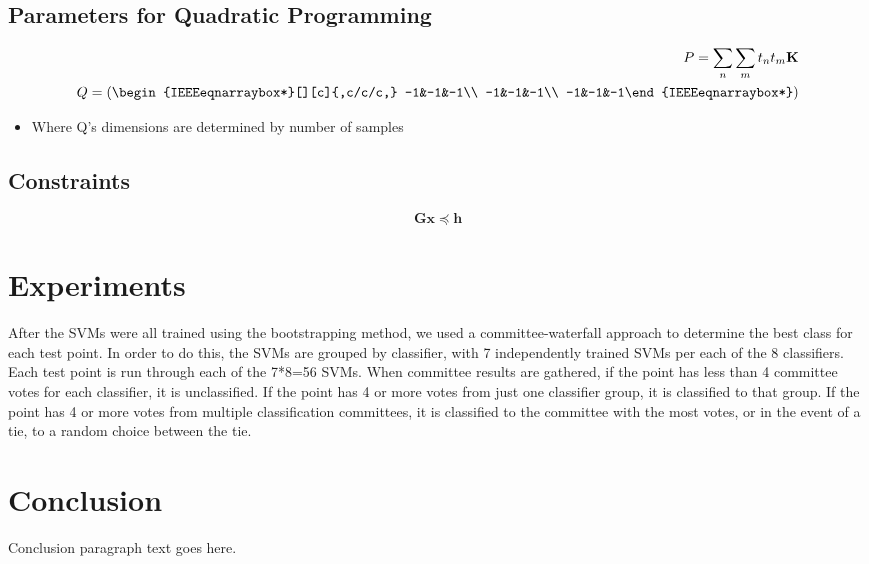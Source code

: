 \documentclass[journal]{IEEEtran}
\begin{document}
    \subsection{Parameters for Quadratic Programming}
    \begin{eqnarray}
    P = \sum\limits_{n} \sum\limits_{m} t_n t_m \mathbf{K}\\
    Q = \left(\begin{IEEEeqnarraybox*}[][c]{,c/c/c,}
    -1&-1&-1\\
    -1&-1&-1\\
    -1&-1&-1%
    \end{IEEEeqnarraybox*}\right)
    \end{eqnarray}
    \begin{itemize}
    \item Where Q's dimensions are determined by number of samples
    \end{itemize}

    \subsection{Constraints}
    \begin{equation}
    \mathbf{G} \mathbf{x} \preceq \mathbf{h}
    \end{equation}



\section{Experiments}

After the SVMs were all trained using the bootstrapping method, we used a committee-waterfall approach to determine the best class for each test point.  In order to do this, the SVMs are grouped by classifier, with 7 independently trained SVMs per each of the 8 classifiers.  Each test point is run through each of the 7*8=56 SVMs.  When committee results are gathered, if the point has less than 4 committee votes for each classifier, it is unclassified.  If the point has 4 or more votes from just one classifier group, it is classified to that group. If the point has 4 or more votes from multiple classification committees, it is classified to the committee with the most votes, or in the event of a tie, to a random choice between the tie.

\section{Conclusion}
Conclusion paragraph text goes here.
\end{document}
